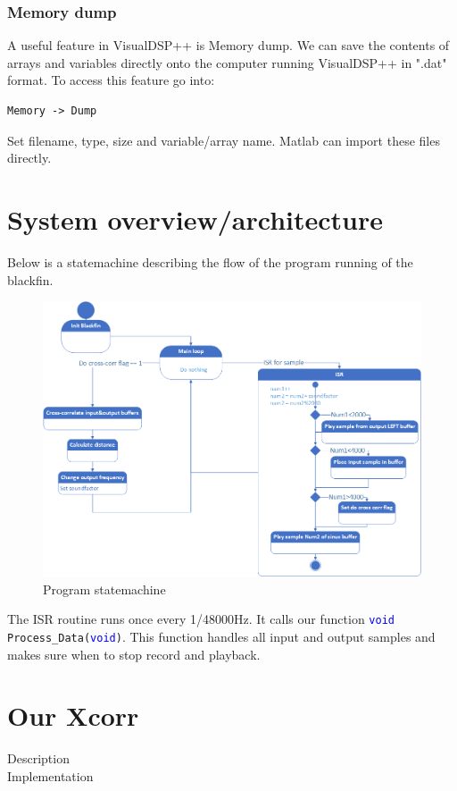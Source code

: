 \subsubsection{Memory dump}
A useful feature in VisualDSP++ is Memory dump. We can save the contents of arrays and variables directly onto the computer running VisualDSP++ in ".dat" format. To access this feature go into:
\begin{verbatim}
Memory -> Dump
\end{verbatim}
Set filename, type, size and variable/array name. Matlab can import these files directly.



\section{System overview/architecture}
Below is a statemachine describing the flow of the program running of the blackfin.\\
\begin{figure}[H]
\centering
\includegraphics[width=1\textwidth]{billeder/code_statemachine}
\caption{Program statemachine}
\end{figure}
The ISR routine runs once every 1/48000Hz. It calls our function \texttt{\textcolor{blue}{void} Process\_Data(\textcolor{blue}{void})}. This function handles all input and output samples and makes sure when to stop record and playback.\\
\section{Our Xcorr}
Description\\
Implementation\\